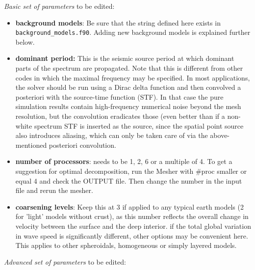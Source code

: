 \documentclass[11pt,letter,fleqn,english,notitlepage]{article}
\begin{document}
\noindent \textit{Basic set of parameters} to be edited:
\begin{itemize}
    \item \textbf{background models}: Be sure that the string defined here exists in 
    {\tt background\_models.f90}. Adding new background models is explained further below.
    
    \item \textbf{dominant period:} This is the seismic source period at which
    dominant parts of the spectrum are propagated. Note that this is different
    from other codes in which the maximal frequency may be specified.  In most
    applications, the solver should be run using a Dirac delta function and
    then convolved a posteriori with the source-time function (STF). In that
    case the pure simulation results contain high-frequency numerical noise
    beyond the mesh resolution, but the convolution eradicates those (even
    better than if a non-white spectrum STF is inserted as the source, since
    the spatial point source also introduces aliasing, which can only be taken
    care of via the above-mentioned posteriori convolution.
    
    \item \textbf{number of processors}: needs to be 1, 2, 6 or a multiple of
    4. To get a suggestion for optimal decomposition, run the Mesher with #proc
    smaller or equal 4 and check the OUTPUT file. Then change the number in the
    input file and rerun the mesher.

    \item \textbf{coarsening levels}: Keep this at 3 if applied to any typical earth models
    (2 for 'light' models without crust), as this number reflects the overall
    change in velocity between the surface and the deep interior.  if the total
    global variation in wave speed is significantly different, other options
    may be convenient here. This applies to other spheroidals, homogeneous or
    simply layered models.
\end{itemize}

\newpage
\noindent \textit{Advanced set of parameters} to be edited:
\end{document}
